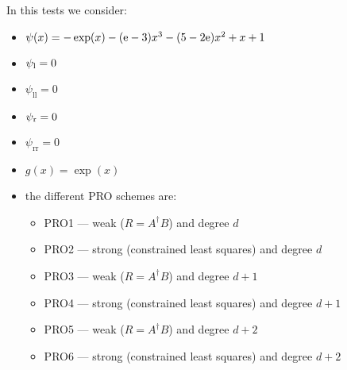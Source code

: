 \documentclass[11pt,a4paper]{article}
\author{}
\title{}
\theoremstyle{plain}
\theoremstyle{definition}
\begin{document}
In this tests we consider:
\begin{itemize}
\item $\psi(x)=-\exp(x)-(\text e-3)x^3-(5-2\text e)x^2+x+1$
\item $\psi_\text l=0$
\item $\psi_\text{ll}=0$
\item $\psi_\text r=0$
\item $\psi_\text{rr}=0$
\item $g(x)=\exp(x)$
\item the different PRO schemes are:
	\begin{itemize}
	\item PRO1 --- weak ($R=A^\dagger B$) and degree $d$
	\item PRO2 --- strong (constrained least squares) and degree $d$
	\item PRO3 --- weak ($R=A^\dagger B$) and degree $d+1$
	\item PRO4 --- strong (constrained least squares) and degree $d+1$
	\item PRO5 --- weak ($R=A^\dagger B$) and degree $d+2$
	\item PRO6 --- strong (constrained least squares) and degree $d+2$
	\end{itemize}
\end{itemize}
\end{document}

